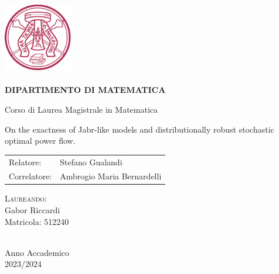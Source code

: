 \thispagestyle{empty}
\begin{center}
	\hrulefill \\
\end{center}

\begin{center}
	\includegraphics[width=3cm]{unipv.png}\\
	
	 \\
	{\bf DIPARTIMENTO DI MATEMATICA }\\
	\vspace*{1cm}
	
	
	\vspace{-8pt}
	\normalsize Corso di Laurea Magistrale in Matematica
\end{center}
\vspace{2cm}


\begin{center}
	\large 	On the exactness of Jabr-like models and distributionally robust stochastic optimal power flow.
	

\end{center}

\vspace*{3cm}

\begin{flushleft}
	\begin{tabular}{ll}
		{\sc Relatore:} & {\sc Stefano Gualandi}\\
        {\sc Correlatore:} & {\sc Ambrogio Maria Bernardelli} %
	\end{tabular}
\end{flushleft}

\vfill

\begin{flushright}
	\textsc{Laureando:} \\
	{\sc Gabor Riccardi} \\
	Matricola: 512240
\end{flushright}

\vfill

\begin{center}
	\hrulefill \\
	\small Anno Accademico  \\ 2023/2024

\end{center}


